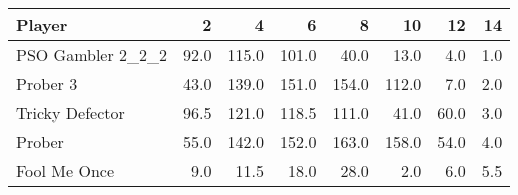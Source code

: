 \begin{tabular}{lrrrrrrr}
\toprule
            Player &     2 &      4 &      6 &      8 &     10 &    12 &   14 \\
\midrule
 PSO Gambler 2\_2\_2 &  92.0 &  115.0 &  101.0 &   40.0 &   13.0 &   4.0 &  1.0 \\
          Prober 3 &  43.0 &  139.0 &  151.0 &  154.0 &  112.0 &   7.0 &  2.0 \\
   Tricky Defector &  96.5 &  121.0 &  118.5 &  111.0 &   41.0 &  60.0 &  3.0 \\
            Prober &  55.0 &  142.0 &  152.0 &  163.0 &  158.0 &  54.0 &  4.0 \\
      Fool Me Once &   9.0 &   11.5 &   18.0 &   28.0 &    2.0 &   6.0 &  5.5 \\
\bottomrule
\end{tabular}
